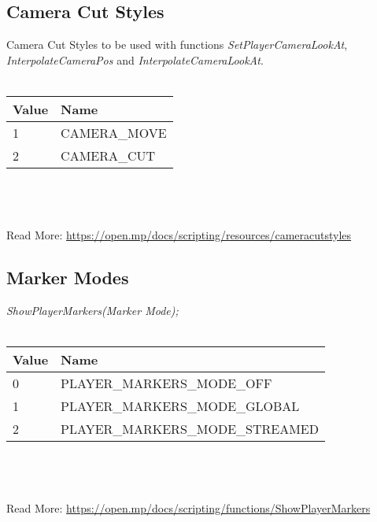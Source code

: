 \documentclass{article}
\begin{document}
\subsection{Camera Cut Styles}
Camera Cut Styles to be used with functions \textit{SetPlayerCameraLookAt}, \textit{InterpolateCameraPos} and \textit{InterpolateCameraLookAt}.
\\
\\
\begin{tabular}{ |l|l| } 
\hline
Value & Name \\
\hline
1 & CAMERA\_MOVE \\ 
2 & CAMERA\_CUT \\ 
\hline
\end{tabular}
\\\\
\\Read More: \url{https://open.mp/docs/scripting/resources/cameracutstyles}


\subsection{Marker Modes}
\textit{ShowPlayerMarkers(Marker Mode);}
\\
\\
\begin{tabular}{ |l|l| } 
\hline
Value & Name \\
\hline
0 & PLAYER\_MARKERS\_MODE\_OFF \\ 
1 & PLAYER\_MARKERS\_MODE\_GLOBAL \\ 
2 & PLAYER\_MARKERS\_MODE\_STREAMED \\
\hline
\end{tabular}
\\\\
\\Read More: \url{https://open.mp/docs/scripting/functions/ShowPlayerMarkers}
\end{document}
